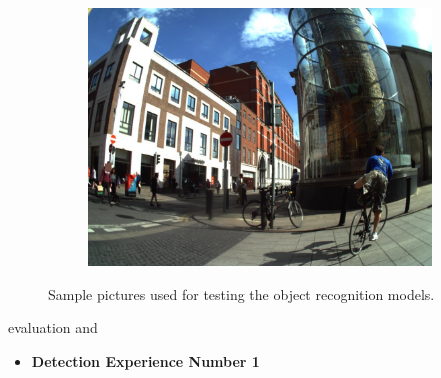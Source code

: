 \begin{figure}[H]
\begin{subfigure}{0.3\textwidth}
  \includegraphics[width=\textwidth]{Sections/4InitialWork/4_images_obj_run4/photo.jpg}
  \end{subfigure}

  \caption[Sample pictures used for testing]{Sample pictures used for testing the object recognition models.}
  \end{figure}



  evaluation and
    
  \begin{itemize}
    \item \textbf{Detection Experience Number 1}
  \end{itemize}

    

